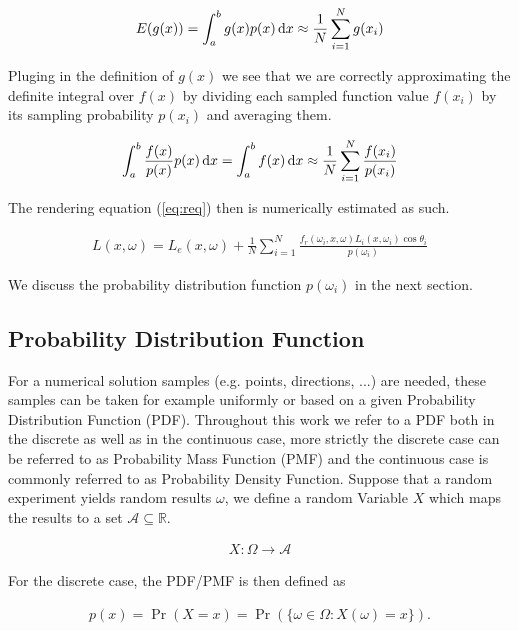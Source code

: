 \begin{align}
E(g(x)) = \int_a^b g(x)p(x)\mathop{}\!\mathrm{d} x \approx \frac{1}{N} \sum_{i=1}^{N} g(x_i) 
\end{align}

Pluging in the definition of $g(x)$ we see that we are correctly approximating the definite integral over $f(x)$ by dividing each sampled function value $f(x_i)$ by its sampling probability $p(x_i)$ and averaging them.

\begin{align}
\label{eq:mci}
\int_a^b \frac{f(x)}{p(x)}p(x)\mathop{}\!\mathrm{d} x = \int_a^b f(x) \mathop{}\!\mathrm{d} x \approx \frac{1}{N} \sum_{i=1}^{N} \frac{f(x_i)}{p(x_i)}
\end{align}


The rendering equation (\ref{eq:req}) then is numerically estimated as such.

\begin{align}
\label{eq:reqmc}
L(x, \omega) =  L_e(x, \omega) + \frac{1}{N} \sum_{i=1}^{N} \frac{f_r(\omega_i, x, \omega) L_i(x, \omega_i)\cos\theta_i}{p(\omega_i)}
\end{align}

We discuss the probability distribution function $p(\omega_i)$ in the next section. 

\subsection{Probability Distribution Function}
\label{sec:PDF}

For a numerical solution samples (e.g. points, directions, ...) are needed, these samples can be taken for example uniformly or based on a given Probability Distribution Function (PDF). Throughout this work we refer to a PDF both in the discrete as well as in the continuous case, more strictly the discrete case can be referred to as Probability Mass Function (PMF) and the continuous case is commonly referred to as Probability Density Function. Suppose that a random experiment yields random results $\omega$, we define a random Variable $X$ which maps the results to a set $\mathcal{A} \subseteq \mathbb{R}$.

\begin{align}
X: \Omega \rightarrow \mathcal{A}
\end{align}

For the discrete case, the PDF/PMF is then defined as

\begin{align}
p(x) = \Pr(X = x) = \Pr( \{\omega \in \Omega : X(\omega) = x \} ).
\end{align}

